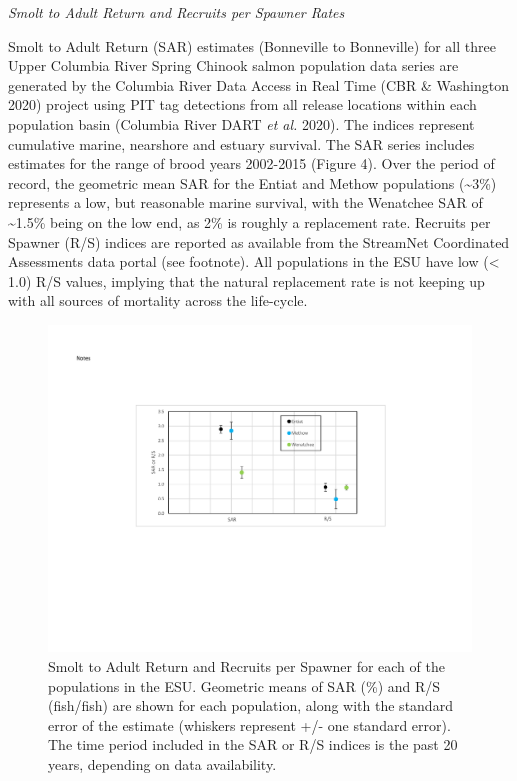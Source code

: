 \documentclass[
  letterpaper,
  oneside,
  open=any]{scrbook}
\begin{document}
\emph{Smolt to Adult Return and Recruits per Spawner Rates}

Smolt to Adult Return (SAR) estimates (Bonneville to Bonneville) for all
three Upper Columbia River Spring Chinook salmon population data series
are generated by the Columbia River Data Access in Real Time (CBR \&
Washington 2020) project using PIT tag detections from all release
locations within each population basin (Columbia River DART \emph{et
al.} 2020). The indices represent cumulative marine, nearshore and
estuary survival. The SAR series includes estimates for the range of
brood years 2002-2015 (Figure 4). Over the period of record, the
geometric mean SAR for the Entiat and Methow populations
(\textasciitilde3\%) represents a low, but reasonable marine survival,
with the Wenatchee SAR of \textasciitilde1.5\% being on the low end, as
2\% is roughly a replacement rate. Recruits per Spawner (R/S) indices
are reported as available from the StreamNet Coordinated Assessments
data portal (see footnote). All populations in the ESU have low
(\textless{} 1.0) R/S values, implying that the natural replacement rate
is not keeping up with all sources of mortality across the life-cycle.

\begin{figure}

{\centering \includegraphics[width=4.65in,height=\textheight]{content/Interior_Columbia/../../media/image9.png}

}

\caption{\label{fig-UC-Spr-Chinook-Smolt-to-Adult}Smolt to Adult Return
and Recruits per Spawner for each of the populations in the ESU.
Geometric means of SAR (\%) and R/S (fish/fish) are shown for each
population, along with the standard error of the estimate (whiskers
represent +/- one standard error). The time period included in the SAR
or R/S indices is the past 20 years, depending on data availability.}

\end{figure}
\end{document}
